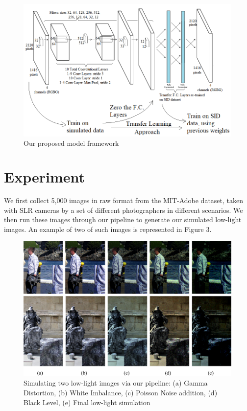 \documentclass{article}
\begin{document}
\begin{figure}[ht]
  \centering
  \includegraphics[scale=0.3]{model.png}
  \caption{Our proposed model framework}
\end{figure}



\section{Experiment}

We first collect 5,000 images in raw format from the MIT-Adobe dataset, taken with SLR cameras by a set of different photographers in different scenarios. We then run these images through our pipeline to generate our simulated low-light images. An example of two of such images is represented in Figure 3. 

\begin{figure}[ht]
  \centering
  \includegraphics[scale=0.3]{fig3.png}
  \caption{Simulating two low-light images via our pipeline: (a) Gamma Distortion, (b) White Imbalance, (c) Poisson Noise addition, (d) Black Level, (e) Final low-light simulation}
\end{figure}
\end{document}
